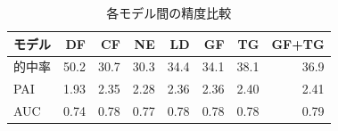 \begin{table}[htbp]
  \centering
  \caption{各モデル間の精度比較}
  \begin{tabular}{l|r|r|r|r|r|r|r}
  \hline

  モデル & DF & CF & NE & LD & GF & TG & GF+TG \\  \hline\hline
的中率 & 50.2 & 30.7 & 30.3 & 34.4 & 34.1 & 38.1 & 36.9 \\ 
PAI & 1.93 & 2.35 & 2.28 & 2.36 & 2.36 & 2.40 & 2.41 \\ 
AUC & 0.74 & 0.78 & 0.77 & 0.78 & 0.78 & 0.78 & 0.79 \\ \hline


  \end{tabular}
  \label{tb:non-crime-no-timeseries-index}
\end{table}

\FloatBarrier